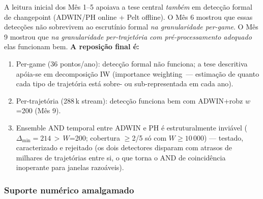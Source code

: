 \documentclass[11pt,a4paper]{article}
\begin{document}
A leitura inicial dos M\^es 1--5 apoiava a tese central \emph{tamb\'em} em
detec\c{c}\~ao formal de changepoint (ADWIN/PH online + Pelt offline).
O M\^es 6 mostrou que essas detec\c{c}\~oes n\~ao sobrevivem ao escrut\'inio
formal \emph{na granularidade per-game}. O M\^es 9 mostrou que \emph{na
granularidade per-trajet\'oria com pr\'e-processamento adequado} elas
funcionam bem. \textbf{A reposi\c{c}\~ao final \'e:}
\begin{enumerate}[leftmargin=1.4em,itemsep=2pt]
    \item Per-game (36 pontos/ano): detec\c{c}\~ao formal n\~ao funciona;
          a tese descritiva ap\'oia-se em decomposi\c{c}\~ao IW
          (importance weighting~--- estima\c{c}\~ao de quanto cada tipo de
          trajet\'oria est\'a sobre- ou sub-representada em cada ano).
    \item Per-trajet\'oria (288\,k stream): detec\c{c}\~ao funciona bem
          com ADWIN+robz $w$=200 (M\^es 9).
    \item Ensemble AND temporal entre ADWIN e PH \'e estruturalmente
          invi\'avel ($\Delta_{\min}\!=\!214$\,$>$\,$W$=200; cobertura
          $\geq$2/5 s\'o com $W\!\geq\!10\,000$) --- testado,
          caracterizado e rejeitado (os dois detectores disparam com
          atrasos de milhares de trajet\'orias entre si, o que torna o
          AND de coincid\^encia inoperante para janelas razo\'aveis).
\end{enumerate}

\subsubsection{Suporte num\'erico amalgamado}
\end{document}

